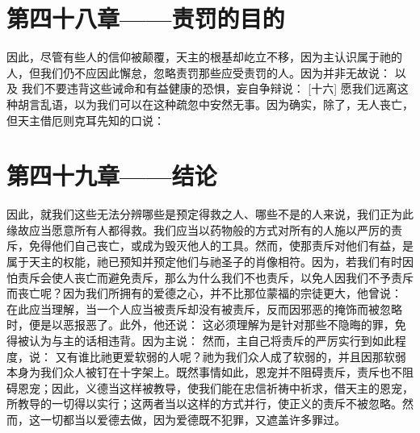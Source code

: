 
\section{第四十八章——责罚的目的}

因此，尽管有些人的信仰被颠覆，天主的根基却屹立不移，因为主认识属于祂的人，但我们仍不应因此懈怠，忽略责罚那些应受责罚的人。因为并非无故说： 以及 我们不要违背这些诫命和有益健康的恐惧，妄自争辩说： [十六] 愿我们远离这种胡言乱语，以为我们可以在这种疏忽中安然无事。因为确实，除了，无人丧亡，但天主借厄则克耳先知的口说： \par


\section{第四十九章——结论}

因此，就我们这些无法分辨哪些是预定得救之人、哪些不是的人来说，我们正为此缘故应当愿意所有人都得救。我们应当以药物般的方式对所有的人施以严厉的责斥，免得他们自己丧亡，或成为毁灭他人的工具。然而，使那责斥对他们有益，是属于天主的权能，祂已预知并预定他们与祂圣子的肖像相符。因为，若我们有时因怕责斥会使人丧亡而避免责斥，那么为什么我们不也责斥，以免人因我们不予责斥而丧亡呢？因为我们所拥有的爱德之心，并不比那位蒙福的宗徒更大，他曾说： 在此应当理解，当一个人应当被责斥却没有被责斥，反而因邪恶的掩饰而被忽略时，便是以恶报恶了。此外，他还说： 这必须理解为是针对那些不隐晦的罪，免得被认为与主的话相违背。因为主说： 然而，主自己将责斥的严厉实行到如此程度，说： 又有谁比祂更爱软弱的人呢？祂为我们众人成了软弱的，并且因那软弱本身为我们众人被钉在十字架上。既然事情如此，恩宠并不阻碍责斥，责斥也不阻碍恩宠；因此，义德当这样被教导，使我们能在忠信祈祷中祈求，借天主的恩宠，所教导的一切得以实行；这两者当以这样的方式并行，使正义的责斥不被忽略。然而，这一切都当以爱德去做，因为爱德既不犯罪，又遮盖许多罪过。\par

